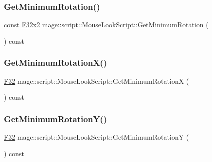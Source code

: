 \subsubsection{\texorpdfstring{Get\+Minimum\+Rotation()}{GetMinimumRotation()}}
{\footnotesize\ttfamily const \hyperlink{namespacemage_aa87237ad091f5cd7da612b8523fc108f}{F32x2} mage\+::script\+::\+Mouse\+Look\+Script\+::\+Get\+Minimum\+Rotation (\begin{DoxyParamCaption}{ }\end{DoxyParamCaption}) const\hspace{0.3cm}{\ttfamily [noexcept]}}

\hypertarget{classmage_1_1script_1_1_mouse_look_script_ae594a42302f9ccd47e08070759c3ccf7}{}\label{classmage_1_1script_1_1_mouse_look_script_ae594a42302f9ccd47e08070759c3ccf7} 
\subsubsection{\texorpdfstring{Get\+Minimum\+Rotation\+X()}{GetMinimumRotationX()}}
{\footnotesize\ttfamily \hyperlink{namespacemage_aa97e833b45f06d60a0a9c4fc22ae02c0}{F32} mage\+::script\+::\+Mouse\+Look\+Script\+::\+Get\+Minimum\+RotationX (\begin{DoxyParamCaption}{ }\end{DoxyParamCaption}) const\hspace{0.3cm}{\ttfamily [noexcept]}}

\hypertarget{classmage_1_1script_1_1_mouse_look_script_a8faf82867207fb604f7155b8dbadfdb0}{}\label{classmage_1_1script_1_1_mouse_look_script_a8faf82867207fb604f7155b8dbadfdb0} 
\subsubsection{\texorpdfstring{Get\+Minimum\+Rotation\+Y()}{GetMinimumRotationY()}}
{\footnotesize\ttfamily \hyperlink{namespacemage_aa97e833b45f06d60a0a9c4fc22ae02c0}{F32} mage\+::script\+::\+Mouse\+Look\+Script\+::\+Get\+Minimum\+RotationY (\begin{DoxyParamCaption}{ }\end{DoxyParamCaption}) const\hspace{0.3cm}{\ttfamily [noexcept]}}

